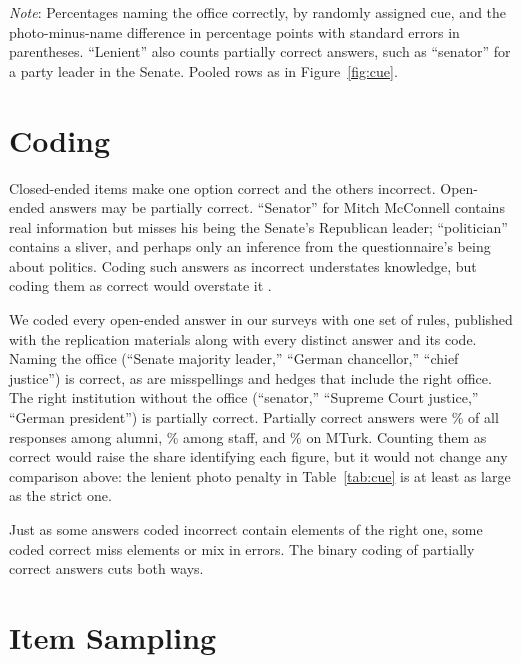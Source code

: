 \documentclass[11pt]{article}
\begin{document}
\begin{table}[htbp]
\centering\TableStyle
\caption{Identifying public figures by name and by photo.}
\label{tab:cue}
\begin{minipage}{0.95\linewidth}\footnotesize
\emph{Note}: Percentages naming the office correctly, by randomly assigned cue, and the photo-minus-name difference in percentage points with standard errors in parentheses. ``Lenient'' also counts partially correct answers, such as ``senator'' for a party leader in the Senate. Pooled rows as in Figure~\ref{fig:cue}.
\end{minipage}
\end{table}

\section{Coding}

Closed-ended items make one option correct and the others incorrect. Open-ended answers may be partially correct. ``Senator'' for Mitch McConnell contains real information but misses his being the Senate's Republican leader; ``politician'' contains a sliver, and perhaps only an inference from the questionnaire's being about politics. Coding such answers as incorrect understates knowledge, but coding them as correct would overstate it \citep{gibson2009, krosnick2008, debell2013}.

We coded every open-ended answer in our surveys with one set of rules, published with the replication materials along with every distinct answer and its code. Naming the office (``Senate majority leader,'' ``German chancellor,'' ``chief justice'') is correct, as are misspellings and hedges that include the right office. The right institution without the office (``senator,'' ``Supreme Court justice,'' ``German president'') is partially correct. Partially correct answers were \partialAlumni\% of all responses among alumni, \partialStaff\% among staff, and \partialMturk\% on MTurk. Counting them as correct would raise the share identifying each figure, but it would not change any comparison above: the lenient photo penalty in Table~\ref{tab:cue} is at least as large as the strict one.

Just as some answers coded incorrect contain elements of the right one, some coded correct miss elements or mix in errors. The binary coding of partially correct answers cuts both ways.

\section{Item Sampling}
\end{document}
